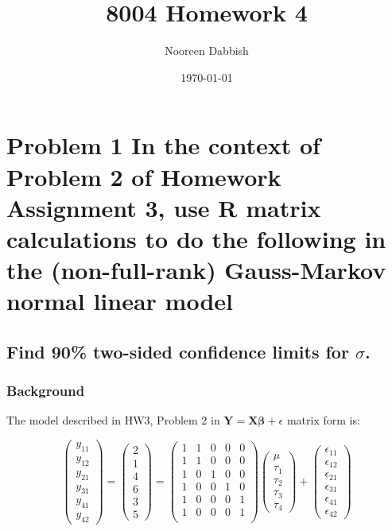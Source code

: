 \documentclass[11pt]{article}
\title{8004 Homework 4}
\author{Nooreen Dabbish}
\date{\today}
\begin{document}
\maketitle




\section{Problem 1 In the context of Problem 2 of Homework Assignment 3, use R matrix calculations to do the following in the (non-full-rank) Gauss-Markov normal linear model}
\label{sec-1}
\subsection{Find 90\% two-sided confidence limits for $\sigma$.}
\label{sec-1-1}
\subsubsection{Background}
\label{sec-1-1-1}


The model described in HW3, Problem 2 in 
$\mathbf{Y}=\mathbf{X\beta}+\epsilon$ matrix form is:

\[
\begin{pmatrix}
y_{11} \\ y_{12}\\ y_{21}\\ y_{31}\\ y_{41}\\ y_{42}
\end{pmatrix} = 
\begin{pmatrix} 
2\\ 1\\ 4\\ 6\\ 3\\ 5
\end{pmatrix} = 
\begin{pmatrix}
1 & 1 & 0 & 0 & 0 \\
1 & 1 & 0 & 0 & 0 \\
1 & 0 & 1 & 0 & 0 \\
1 & 0 & 0 & 1 & 0 \\
1 & 0 & 0 & 0 & 1 \\
1 & 0 & 0 & 0 & 1 \\
\end{pmatrix}  
\begin{pmatrix}
\mu \\ \tau_1 \\ \tau_2 \\ \tau_3 \\ \tau_4 
\end{pmatrix} + 
\begin{pmatrix}
\epsilon_{11} \\ \epsilon_{12}\\ \epsilon_{21}\\ \epsilon_{31}\\ \epsilon_{41}\\ \epsilon_{42}
\end{pmatrix}
\]
\end{document}
